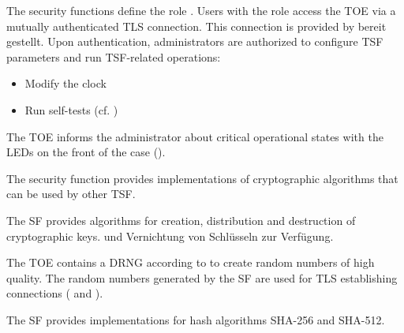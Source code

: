 

The security functions define the role . Users with the
role  access the TOE via a mutually authenticated TLS
connection. This connection is provided by
 bereit gestellt. Upon authentication, administrators are authorized to configure TSF parameters and run TSF-related operations:

\begin{itemize}
\item Modify the clock
\item Run self-tests (cf. )
\end{itemize}

The TOE informs the administrator about critical operational states with the
LEDs on the front of the case ().



The security function  provides
implementations of cryptographic algorithms that can be used by other TSF.


The SF provides algorithms for creation, distribution and destruction of
cryptographic keys.  und Vernichtung von Schlüsseln zur Verfügung.



The TOE contains a DRNG according to  to create
random numbers of high quality. The random numbers generated by the SF are used
for TLS establishing connections ( and
).



The SF provides implementations for hash algorithms SHA-256 and SHA-512.


